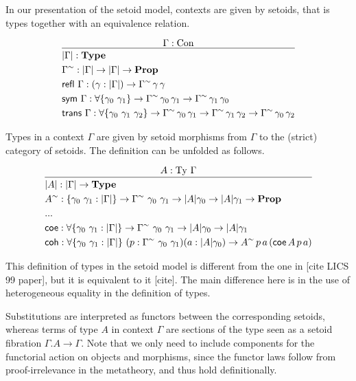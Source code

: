 \documentclass{easychair}
\newcommand{\GG}{\Gamma}
\newcommand{\mType}{\mathbf{Type}}
\newcommand{\mProp}{\mathbf{Prop}}
\newcommand{\Con}{\mathrm{Con}}
\newcommand{\Ty}{\mathrm{Ty}}
\begin{document}
In our presentation of the setoid model, contexts are given by setoids, that is
types together with an equivalence relation.

\[
\infer{
  \begin{aligned}
    & | \GG | : \mType \\
    & \GG^\sim : | \GG | \to | \GG | \to \mProp \\
    & \textsf{refl}\ \GG : (\gamma : | \GG |) \to \GG^\sim\,\gamma\,\gamma \\
    & \textsf{sym} \ \GG : \forall\{\gamma_0\ \gamma_1\} \to \GG^\sim\,\gamma_0\,\gamma_1
    \to \GG^\sim\,\gamma_1\,\gamma_0 \\
    & \textsf{trans} \ \GG : \forall\{\gamma_0\ \gamma_1\ \gamma_2\}
    \to \GG^\sim\,\gamma_0\,\gamma_1
    \to \GG^\sim\,\gamma_1\,\gamma_2
    \to \GG^\sim\,\gamma_0\,\gamma_2
  \end{aligned}
}{
  \GG : \Con
}
\]

Types in a context $\GG$ are given by setoid morphisms from $\GG$ to the
(strict) category of setoids. The definition can be unfolded as follows.

\[
\infer{
  \begin{aligned}
    & | A | : | \GG | \to \mType \\
    & A^\sim : \{\gamma_0\ \gamma_1 : | \GG |\}
    \to \GG^\sim\ \gamma_0\ \gamma_1 \to | A | \gamma_0 \to | A | \gamma_1 \to \mProp \\
    & ... \\
    & \textsf{coe} : \forall\{\gamma_0\ \gamma_1 : | \GG |\} \to \GG^\sim\ \gamma_0\ \gamma_1 \to | A | \gamma_0 \to | A | \gamma_1 \\
    & \textsf{coh} : \forall\{\gamma_0\ \gamma_1 : | \GG |\} \ (p : \GG^\sim\ \gamma_0\ \gamma_1) (a : | A | \gamma_0)
    \to A^\sim\,p\,a\,(\textsf{coe}\,A\,p\,a) \\
  \end{aligned}
}{
  A : \Ty\ \GG
}
\]

This definition of types in the setoid model is different from the one in [cite
  LICS 99 paper], but it is equivalent to it [cite]. The main difference here is
in the use of heterogeneous equality in the definition of types.

Substitutions are interpreted as functors between the corresponding setoids,
whereas terms of type $A$ in context $\GG$ are sections of the type seen as a
setoid fibration $\GG . A \to \GG$. Note that we only need to include components
for the functorial action on objects and morphisms, since the functor laws
follow from proof-irrelevance in the metatheory, and thus hold definitionally.
\end{document}

